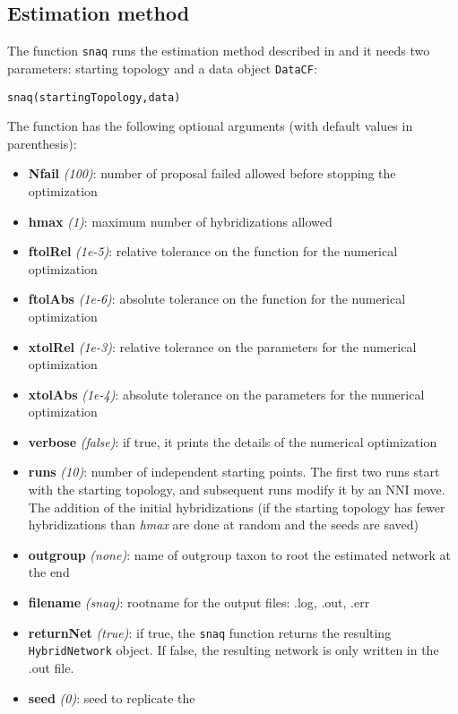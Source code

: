 \documentclass[12pt]{article}
\begin{document}
\subsection{Estimation method}
The function \texttt{snaq} runs the estimation method described in
\citep{Solis-Lemus2015} and it needs two parameters: starting
topology and a data object \texttt{DataCF}:
\begin{lstlisting}
snaq(startingTopology,data)
\end{lstlisting}
The function has the following optional arguments (with default values in parenthesis):
\begin{itemize}
\item \textbf{Nfail} \textit{(100)}: number of proposal failed allowed before
  stopping the optimization
\item \textbf{hmax} \textit{(1)}: maximum number of hybridizations
  allowed
\item \textbf{ftolRel} \textit{(1e-5)}: relative tolerance on the function for the numerical
optimization
\item \textbf{ftolAbs} \textit{(1e-6)}: absolute tolerance on the function for the numerical optimization
\item \textbf{xtolRel} \textit{(1e-3)}: relative tolerance on the parameters for the numerical optimization
\item \textbf{xtolAbs} \textit{(1e-4)}: absolute tolerance on the parameters for the numerical optimization
\item \textbf{verbose} \textit{(false)}: if true, it prints the details of the numerical optimization
\item \textbf{runs} \textit{(10)}: number of independent starting points. The
  first two runs start with the starting topology, and subsequent runs
  modify it by an NNI move. The addition of the initial hybridizations
  (if the starting topology has fewer hybridizations than
  \textit{hmax} are done at random and the seeds are saved)
\item \textbf{outgroup} \textit{(none)}: name of outgroup taxon to root the estimated
network at the end
\item \textbf{filename} \textit{(snaq)}: rootname for the output files: .log, .out, .err
\item \textbf{returnNet} \textit{(true)}: if true, the \texttt{snaq} function
  returns the resulting \texttt{HybridNetwork} object. If false, the
  resulting network is only written in the .out file.
\item \textbf{seed} \textit{(0)}: seed to replicate the

\end{itemize}
\end{document}
